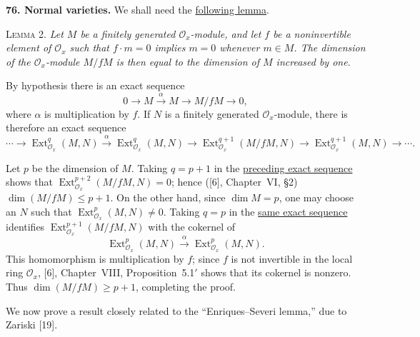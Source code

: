 
\medskip
{}\label{fac:III:5:no:76}
\textbf{76. Normal varieties.} We shall need the \hyperref[fac:III:5:no:76:lemma:2]{following lemma}.

\label{fac:III:5:no:76:lemma:2}
\textsc{Lemma 2.} \textit{Let $M$ be a finitely generated
$\mathcal O_x$-module, and let $f$ be a noninvertible element of
$\mathcal O_x$ such that $f\cdot m=0$ implies $m=0$ whenever $m\in M$.
The dimension of the $\mathcal O_x$-module $M/fM$ is then equal to the
dimension of $M$ increased by one.}

By hypothesis there is an exact sequence
\label{fac:III:5:no:76:formula:short-exact}
\[
0\longrightarrow M\overset\alpha\longrightarrow M
\longrightarrow M/fM\longrightarrow0,
\]
where $\alpha$ is multiplication by $f$. If $N$ is a finitely
generated $\mathcal O_x$-module, there is therefore an exact sequence
\label{fac:III:5:no:76:formula:long-exact}
\[
\cdots\longrightarrow\operatorname{Ext}_{\mathcal O_x}^q(M,N)
\overset\alpha\longrightarrow\operatorname{Ext}_{\mathcal O_x}^q(M,N)
\longrightarrow\operatorname{Ext}_{\mathcal O_x}^{q+1}(M/fM,N)
\longrightarrow\operatorname{Ext}_{\mathcal O_x}^{q+1}(M,N)
\longrightarrow\cdots .
\]

Let $p$ be the dimension of $M$. Taking $q=p+1$ in the
\hyperref[fac:III:5:no:76:formula:long-exact]{preceding exact
sequence} shows that
$\operatorname{Ext}_{\mathcal O_x}^{p+2}(M/fM,N)=0$; hence
([6], Chapter~VI, \S2) $\dim(M/fM)\leq p+1$. On the other hand, since
$\dim M=p$, one may choose an $N$ such that
$\operatorname{Ext}_{\mathcal O_x}^p(M,N)\neq0$. Taking $q=p$ in the
\hyperref[fac:III:5:no:76:formula:long-exact]{same exact sequence} identifies
$\operatorname{Ext}_{\mathcal O_x}^{p+1}(M/fM,N)$ with the cokernel of
\label{fac:III:5:no:76:formula:cokernel-map}
\[
\operatorname{Ext}_{\mathcal O_x}^p(M,N)
\overset\alpha\longrightarrow\operatorname{Ext}_{\mathcal O_x}^p(M,N).
\]
This homomorphism is multiplication by $f$; since $f$ is not invertible
in the local ring $\mathcal O_x$, [6], Chapter~VIII,
Proposition~5.1$'$ shows that its cokernel is nonzero. Thus
$\dim(M/fM)\geq p+1$, completing the proof.

We now prove a result closely related to the ``Enriques--Severi
lemma,'' due to Zariski [19].

